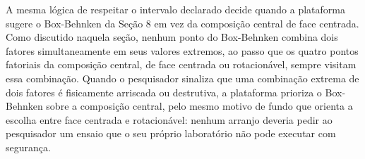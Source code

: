 \documentclass{doeapostila}
\begin{document}
A mesma lógica de respeitar o intervalo declarado decide quando a
plataforma sugere o Box-Behnken da Seção 8 em vez da composição central de
face centrada. Como discutido naquela seção, nenhum ponto do Box-Behnken
combina dois fatores simultaneamente em seus valores extremos, ao passo que
os quatro pontos fatoriais da composição central, de face centrada ou
rotacionável, sempre visitam essa combinação. Quando o pesquisador
sinaliza que uma combinação extrema de dois fatores é fisicamente arriscada
ou destrutiva, a plataforma prioriza o Box-Behnken sobre a composição
central, pelo mesmo motivo de fundo que orienta a escolha entre face
centrada e rotacionável: nenhum arranjo deveria pedir ao pesquisador um
ensaio que o seu próprio laboratório não pode executar com segurança.

\paginadireitos
\end{document}
